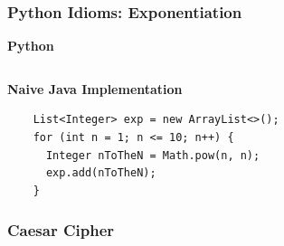 \documentclass{beamer}
\begin{document}
\begin{frame}[fragile]
  \frametitle{Python Idioms: Exponentiation}
  \textbf{Python}
  \inputminted{python}{exponentiation.py}
  
  \textbf{Naive Java Implementation}
  \begin{lstlisting}
    List<Integer> exp = new ArrayList<>();
    for (int n = 1; n <= 10; n++) {
      Integer nToTheN = Math.pow(n, n);
      exp.add(nToTheN);
    }
  \end{lstlisting}
\end{frame}


\begin{frame}
  \frametitle{Caesar Cipher}
  \inputminted{python}{caesar.py}
\end{frame}
\end{document}
